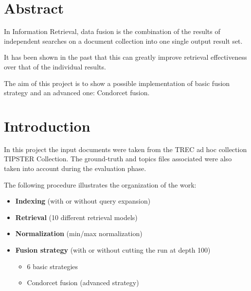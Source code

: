 


    \printTitle
    \newpage
    \tableofcontents
    \newpage
    \section{Abstract}
    In Information Retrieval, data fusion is the combination of the results
    of independent searches on a document collection into one single output
    result set.

    It has been shown in the past that this can greatly improve retrieval
    effectiveness over that of the individual results.

    The aim of this project is to show a possible implementation of basic
    fusion strategy and an advanced one: Condorcet fusion.


    \section{Introduction}

    In this project the input documents were taken from the TREC ad hoc collection
	TIPSTER Collection. The ground-truth and topics files associated were also taken
	into account during the evaluation phase.
    
    The following procedure illustrates the organization of the work:

    \begin{itemize}
        \item \textbf{Indexing} (with or without query expansion)
        \item \textbf{Retrieval} (10 different retrieval models)
		\item \textbf{Normalization} (min/max normalization)
        \item \textbf{Fusion strategy} (with or without cutting the run at depth 100)
            \begin{itemize}
                \item 6 basic strategies
                \item Condorcet fusion (advanced strategy)
            \end{itemize}
    \end{itemize}
    
